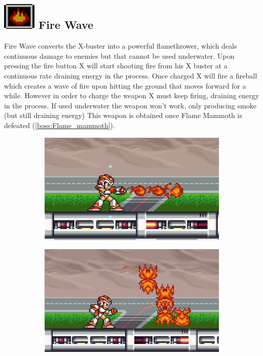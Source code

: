 \subsection{\includegraphics[scale=0.2]{figures/X1/Flame_mammoth/Fire_W.png} Fire Wave}\label{Fire_wave}
Fire Wave converts the X-buster into a powerful flamethrower, which deals continuous damage to enemies but that cannot be used underwater. Upon pressing the fire button X will start shooting fire from his X buster at a continuous rate draining energy in the process. Once charged X will fire a fireball which creates a wave of fire upon hitting the ground that moves forward for a while. However in order to charge the weapon X must keep firing, draining energy in the process. If used underwater the weapon won't work, only producing smoke (but still draining energy)  This weapon is obtained once Flame Mammoth is defeated (\ref{boss:Flame_mammoth}). 
\begin{figure}[htp]
	\centering
	\begin{subfigure}{0.35\linewidth}
		\centering
		\includegraphics[width=\linewidth]{figures/X1/weapons/Fire_wave_1.jpg}
	\end{subfigure}
	\begin{subfigure}{0.35\linewidth}
		\centering
		\includegraphics[width=\linewidth]{figures/X1/weapons/Fire_wave_3.jpg}
	\end{subfigure}
\end{figure}
